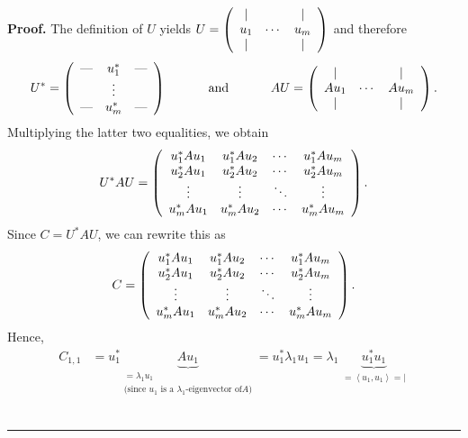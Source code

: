 \documentclass[numbers=enddot,12pt,final,onecolumn,notitlepage]{scrartcl}%
\numberwithin{exer}{subsection}
\theoremstyle{definition}
\newenvironment{proof}[1][Proof]{\noindent\textbf{#1.} }{\ \rule{0.5em}{0.5em}}
\begin{document}
\begin{proof}
The definition of $U$ yields $U=\left(
\begin{array}
[c]{ccc}%
\mid &  & \mid\\
u_{1} & \cdots & u_{m}\\
\mid &  & \mid
\end{array}
\right)  $ and therefore%
\[
U^{\ast}=\left(
\begin{array}
[c]{ccc}%
\text{---} & u_{1}^{\ast} & \text{---}\\
& \vdots & \\
\text{---} & u_{m}^{\ast} & \text{---}%
\end{array}
\right)  \ \ \ \ \ \ \ \ \ \ \text{and}\ \ \ \ \ \ \ \ \ \ AU=\left(
\begin{array}
[c]{ccc}%
\mid &  & \mid\\
Au_{1} & \cdots & Au_{m}\\
\mid &  & \mid
\end{array}
\right)  .
\]
Multiplying the latter two equalities, we obtain%
\[
U^{\ast}AU=\left(
\begin{array}
[c]{cccc}%
u_{1}^{\ast}Au_{1} & u_{1}^{\ast}Au_{2} & \cdots & u_{1}^{\ast}Au_{m}\\
u_{2}^{\ast}Au_{1} & u_{2}^{\ast}Au_{2} & \cdots & u_{2}^{\ast}Au_{m}\\
\vdots & \vdots & \ddots & \vdots\\
u_{m}^{\ast}Au_{1} & u_{m}^{\ast}Au_{2} & \cdots & u_{m}^{\ast}Au_{m}%
\end{array}
\right)  .
\]
Since $C=U^{\ast}AU$, we can rewrite this as%
\begin{equation}
C=\left(
\begin{array}
[c]{cccc}%
u_{1}^{\ast}Au_{1} & u_{1}^{\ast}Au_{2} & \cdots & u_{1}^{\ast}Au_{m}\\
u_{2}^{\ast}Au_{1} & u_{2}^{\ast}Au_{2} & \cdots & u_{2}^{\ast}Au_{m}\\
\vdots & \vdots & \ddots & \vdots\\
u_{m}^{\ast}Au_{1} & u_{m}^{\ast}Au_{2} & \cdots & u_{m}^{\ast}Au_{m}%
\end{array}
\right)  . \label{pf.thm.jnf.schurtri-diag.3}%
\end{equation}
Hence,
\begin{align}
C_{1,1}  &  =u_{1}^{\ast}\underbrace{Au_{1}}_{\substack{=\lambda_{1}%
u_{1}\\\text{(since }u_{1}\text{ is a }\lambda_{1}\text{-eigenvector of
}A\text{)}}}=u_{1}^{\ast}\lambda_{1}u_{1}=\lambda_{1}\underbrace{u_{1}^{\ast
}u_{1}}_{\substack{=\left\langle u_{1},u_{1}\right\rangle =\left\vert
}}
\end{align}
\end{proof}
\end{document}
